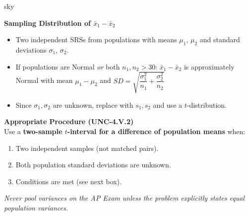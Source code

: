 \documentclass[10pt]{article}
\begin{document}
\begin{skillbox}{sky}
\begin{minipage}[t]{0.48\linewidth}
    \textbf{Sampling Distribution of $\bar x_1 - \bar x_2$}
    \begin{itemize}
        \item Two independent SRSs from populations with means $\mu_1$, $\mu_2$ and
              standard deviations $\sigma_1$, $\sigma_2$.
        \item If populations are Normal \emph{or} both $n_1, n_2 > 30$:
              $\bar x_1 - \bar x_2$ is approximately Normal with
              mean $\mu_1 - \mu_2$ and
              $SD = \sqrt{\dfrac{\sigma_1^2}{n_1} + \dfrac{\sigma_2^2}{n_2}}$
        \item Since $\sigma_1, \sigma_2$ are unknown, replace with $s_1, s_2$ and
              use a $t$-distribution.
    \end{itemize}
\end{minipage}
\hfill
\begin{minipage}[t]{0.48\linewidth}
    \textbf{Appropriate Procedure (UNC-4.V.2)}\\
    Use a \textbf{two-sample $t$-interval for a difference of population means} when:
    \begin{enumerate}
        \item Two independent samples (not matched pairs).
        \item Both population standard deviations are unknown.
        \item Conditions are met (see next box).
    \end{enumerate}
    \textit{Never pool variances on the AP Exam unless the problem explicitly states
    equal population variances.}
\end{minipage}
\end{skillbox}
\end{document}

